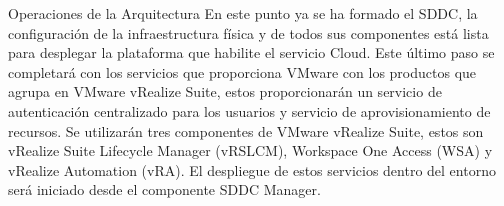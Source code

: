 \begin{subsection}{Operaciones de la Arquitectura}
    En este punto ya se ha formado el SDDC, la configuración de la infraestructura física y de todos sus componentes está lista para desplegar la plataforma que habilite el servicio Cloud. Este último paso se completará con los servicios que proporciona VMware con los productos que agrupa en VMware vRealize Suite, estos proporcionarán un servicio de autenticación centralizado para los usuarios y servicio de aprovisionamiento de recursos. Se utilizarán tres componentes de VMware vRealize Suite, estos son vRealize Suite Lifecycle Manager (vRSLCM), Workspace One Access (WSA) y vRealize Automation (vRA). El despliegue de estos servicios dentro del entorno será iniciado desde el componente SDDC Manager.

    

\end{subsection}

